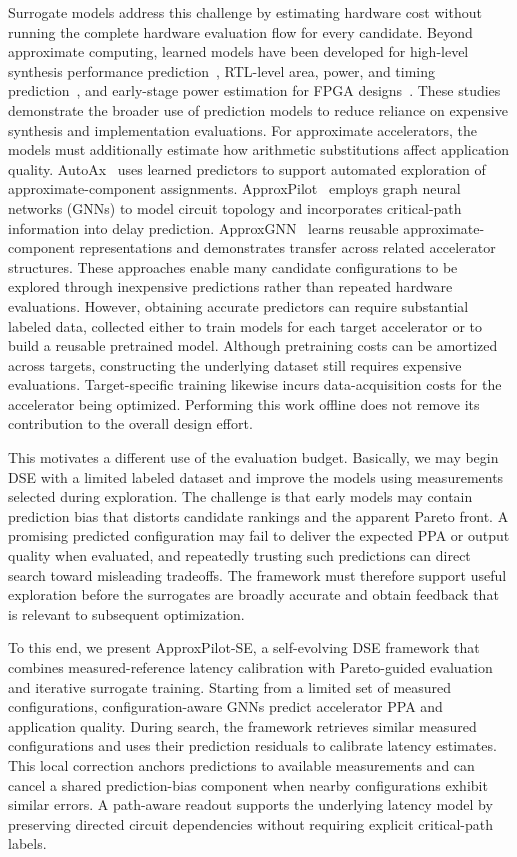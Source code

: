 Surrogate models address this challenge by estimating hardware cost without running the complete hardware evaluation flow for every candidate.
Beyond approximate computing, learned models have been developed for high-level synthesis performance prediction~\cite{wu2022hls_gnn}, RTL-level area, power, and timing prediction~\cite{xu2022sns}, and early-stage power estimation for FPGA designs~\cite{lin2022powergear}.
These studies demonstrate the broader use of prediction models to reduce reliance on expensive synthesis and implementation evaluations.
For approximate accelerators, the models must additionally estimate how arithmetic substitutions affect application quality.
AutoAx~\cite{mrazek2019autoax} uses learned predictors to support automated exploration of approximate-component assignments.
ApproxPilot~\cite{zhang2025approxpilot} employs graph neural networks (GNNs) to model circuit topology and incorporates critical-path information into delay prediction.
ApproxGNN~\cite{vlcek2025approxgnn} learns reusable approximate-component representations and demonstrates transfer across related accelerator structures.
These approaches enable many candidate configurations to be explored through inexpensive predictions rather than repeated hardware evaluations.
However, obtaining accurate predictors can require substantial labeled data, collected either to train models for each target accelerator or to build a reusable pretrained model.
Although pretraining costs can be amortized across targets, constructing the underlying dataset still requires expensive evaluations. Target-specific training likewise incurs data-acquisition costs for the accelerator being optimized.
Performing this work offline does not remove its contribution to the overall design effort.

This motivates a different use of the evaluation budget. Basically, we may begin DSE with a limited labeled dataset and improve the models using measurements selected during exploration.
The challenge is that early models may contain prediction bias that distorts candidate rankings and the apparent Pareto front.
A promising predicted configuration may fail to deliver the expected PPA or output quality when evaluated, and repeatedly trusting such predictions can direct search toward misleading tradeoffs.
The framework must therefore support useful exploration before the surrogates are broadly accurate and obtain feedback that is relevant to subsequent optimization.

To this end, we present ApproxPilot-SE, a self-evolving DSE framework that combines measured-reference latency calibration with Pareto-guided evaluation and iterative surrogate training.
Starting from a limited set of measured configurations, configuration-aware GNNs predict accelerator PPA and application quality.
During search, the framework retrieves similar measured configurations and uses their prediction residuals to calibrate latency estimates.
This local correction anchors predictions to available measurements and can cancel a shared prediction-bias component when nearby configurations exhibit similar errors.
A path-aware readout supports the underlying latency model by preserving directed circuit dependencies without requiring explicit critical-path labels.

